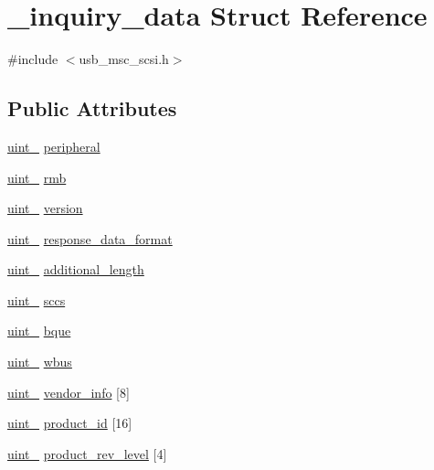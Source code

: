 \hypertarget{struct__inquiry__data}{}\section{\+\_\+inquiry\+\_\+data Struct Reference}
\label{struct__inquiry__data}


{\ttfamily \#include $<$usb\+\_\+msc\+\_\+scsi.\+h$>$}

\subsection*{Public Attributes}
\begin{DoxyCompactItemize}
\item 
\hyperlink{types_8h_ad3209046c23f739a81581c10a4be7d92}{uint\+\_} \hyperlink{struct__inquiry__data_a78ab6604b3ece07b19f46436fb34eb24}{peripheral}
\item 
\hyperlink{types_8h_ad3209046c23f739a81581c10a4be7d92}{uint\+\_} \hyperlink{struct__inquiry__data_a87d897ca3b74615835885d4122ab7489}{rmb}
\item 
\hyperlink{types_8h_ad3209046c23f739a81581c10a4be7d92}{uint\+\_} \hyperlink{struct__inquiry__data_a2bc7d935733ecdec7f591f3c3dccaf7f}{version}
\item 
\hyperlink{types_8h_ad3209046c23f739a81581c10a4be7d92}{uint\+\_} \hyperlink{struct__inquiry__data_a90d3c3f937adb2967325c943b2b1eaa7}{response\+\_\+data\+\_\+format}
\item 
\hyperlink{types_8h_ad3209046c23f739a81581c10a4be7d92}{uint\+\_} \hyperlink{struct__inquiry__data_a951da49625da170d416c16d583ea8614}{additional\+\_\+length}
\item 
\hyperlink{types_8h_ad3209046c23f739a81581c10a4be7d92}{uint\+\_} \hyperlink{struct__inquiry__data_a4fcad4d67aa75b69c6303ace87799f0e}{sccs}
\item 
\hyperlink{types_8h_ad3209046c23f739a81581c10a4be7d92}{uint\+\_} \hyperlink{struct__inquiry__data_a9e90e27b6b8f5f3b6d34f0884c28dcb6}{bque}
\item 
\hyperlink{types_8h_ad3209046c23f739a81581c10a4be7d92}{uint\+\_} \hyperlink{struct__inquiry__data_a26676289ad526640bc2f40f48b40717d}{wbus}
\item 
\hyperlink{types_8h_ad3209046c23f739a81581c10a4be7d92}{uint\+\_} \hyperlink{struct__inquiry__data_a0a1007856051fc01be23c15d9e62a1e7}{vendor\+\_\+info} \mbox{[}8\mbox{]}
\item 
\hyperlink{types_8h_ad3209046c23f739a81581c10a4be7d92}{uint\+\_} \hyperlink{struct__inquiry__data_a6adc548fd164d8d74c79647abfe3fb26}{product\+\_\+id} \mbox{[}16\mbox{]}
\item 
\hyperlink{types_8h_ad3209046c23f739a81581c10a4be7d92}{uint\+\_} \hyperlink{struct__inquiry__data_a51485235c6aaa42d814de55fb99b4596}{product\+\_\+rev\+\_\+level} \mbox{[}4\mbox{]}
\end{DoxyCompactItemize}


